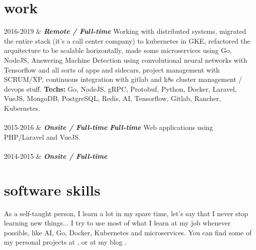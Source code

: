 \documentclass[]{cv-mauri}
\begin{document}
\section*{work}
\begin{tabularcv}
    2016-2019   &   
                    \textbf{\textit{Remote / Full-time}}
                    \newline
                    Working with distributed systems, migrated the entire stack (it's a call center company) to kubernetes in GKE, refactored the arquitecture to be scalable horizontally, made some microservices using Go, NodeJS, Answering Machine Detection using convolutional neural networks with Tensorflow and all sorts of apps and sidecars, project management with SCRUM/XP, continuous integration with gitlab and k8s cluster management / devops stuff.
                    \textbf{Techs:} Go, NodeJS, gRPC, Protobuf, Python, Docker, Laravel, VueJS, MongoDB, PostgreSQL, Redis, AI, Tensorflow, Gitlab, Rancher, Kubernetes.
                    \\[\vspacepar]
                    \\[\vspacepar]
    2015-2016   &   
				    \textbf{\textit{Onsite / Full-time}}
                    \newline 
                    \textbf{\textit{Full-time}}
                    \newline
                    Web applications using PHP/Laravel and VueJS.
                    \\[\vspacepar]
                    \\[\vspacepar]
	2014-2015   &   
					\textbf{\textit{Onsite / Full-time}}
\end{tabularcv}

\section*{software skills}
    As a self-taught person, I learn a lot in my spare time, let's say that I never stop learning new things... I try to use most of what I learn at my job whenever possible, like AI, Go, Docker, Kubernetes and microservices. You can find some of my personal projects at \href{https://github.com/mauri870}{\color{maincolor}{https://github.com/mauri870}}, \href{https://mauri870.github.io}{\color{maincolor}{https://mauri870.github.io}} or at my blog \href{https://mauri870.github.io/blog}{\color{maincolor}{https://mauri870.github.io/blog}}.
\end{document}
